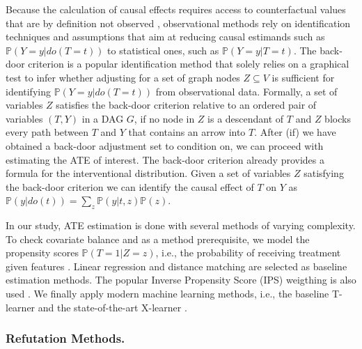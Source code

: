 \documentclass[letterpaper]{article} %
\begin{document}
Because the calculation of causal effects requires access to counterfactual values that are by definition not observed \cite{holland1986statistics}, observational methods rely on identification techniques and assumptions that aim at reducing causal estimands such as $\mathbb{P}(Y=y|do(T=t))$ to statistical ones, such as $\mathbb{P}(Y=y|T=t)$. The back-door criterion is a popular identification method that solely relies on a graphical test to infer whether adjusting for a set of graph nodes $Z\subseteq V$ is sufficient for identifying $\mathbb{P}(Y=y|do(T=t))$ from observational data. Formally, a set of variables $Z$ satisfies the back-door criterion relative to an ordered pair of variables $(T, Y)$ in a DAG $G$, if no node in $Z$ is a descendant of $T$ and $Z$ blocks every path between $T$ and $Y$ that contains an arrow into $T$.
After (if) we have obtained a back-door adjustment set to condition on, we can proceed with estimating the ATE of interest. The back-door criterion already provides a formula for the interventional distribution. Given a set of variables $Z$ satisfying the back-door criterion we can identify the causal effect of $T$ on $Y$ as $\mathbb{P}(y|do(t)) = \sum_z \mathbb{P}(y|t, z)\mathbb{P}(z)$. 

In our study, ATE estimation is done with several methods of varying complexity. To check covariate balance and as a method prerequisite, we model the propensity scores $\mathbb{P}(T=1|Z=z)$, i.e., the probability of receiving treatment given features \cite{rosenbaum1983central}. Linear regression and distance matching are selected as baseline estimation methods. The popular Inverse Propensity Score (IPS) weigthing is also used \cite{stuart2010matching}. We finally apply modern machine learning methods, i.e., the baseline T-learner and the state-of-the-art X-learner \cite{kunzel_metalearners_2019}.

\subsubsection{Refutation Methods.}
\end{document}
